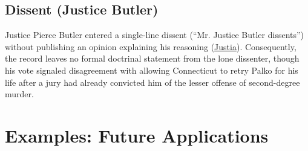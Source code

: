 \documentclass[12pt]{article}
\begin{document}
\subsection{Dissent (Justice Butler)}

Justice Pierce Butler entered a single-line dissent (``Mr. Justice Butler dissents'') without publishing an opinion explaining his reasoning (\href{https://supreme.justia.com/cases/federal/us/302/319/}{Justia}). Consequently, the record leaves no formal doctrinal statement from the lone dissenter, though his vote signaled disagreement with allowing Connecticut to retry Palko for his life after a jury had already convicted him of the lesser offense of second-degree murder.

\section{Examples: Future Applications}
\end{document}
